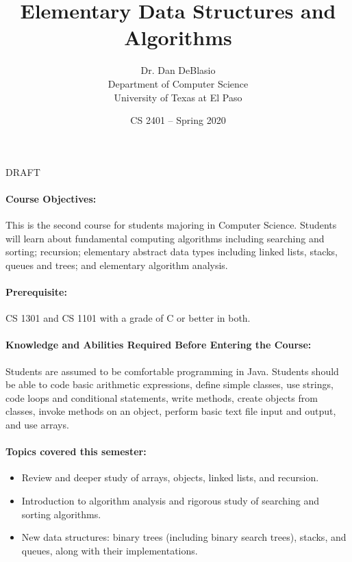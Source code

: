 \documentclass[12pt]{scrartcl}
\title{Elementary Data Structures and Algorithms}\let\Title\@title
\subtitle{
{\small
\vskip0.5cm
Dr. Dan DeBlasio\\
Department of Computer Science \\
University of Texas at El Paso}
\vskip-1cm}
\date{\small CS 2401 -- Spring 2020}
\begin{document}
\maketitle

\begin{center}
{\Huge\color{red}DRAFT}
\end{center}
\paragraph{Course Objectives:} This is the second course for students majoring in Computer Science. Students will learn about fundamental computing algorithms including searching and sorting; recursion; elementary abstract data types including linked lists, stacks, queues and trees; and elementary algorithm analysis. 

\paragraph{Prerequisite:} CS 1301 and CS 1101 with a grade of C or better in both. 

\paragraph{Knowledge and Abilities Required Before Entering the Course:} Students are assumed to be comfortable programming in Java. Students should be able to code basic arithmetic expressions, define simple classes, use strings, code loops and conditional statements, write methods, create objects from classes, invoke methods on an object, perform basic text file input and output, and use arrays.

\paragraph{Topics covered this semester:}
\begin{itemize} 
\item Review and deeper study of arrays, objects, linked lists, and recursion. 
\item Introduction to algorithm analysis and rigorous study of searching and sorting algorithms. 
\item New data structures: binary trees (including binary search trees), stacks, and queues, along with their implementations. 
\end{itemize}
\end{document}

